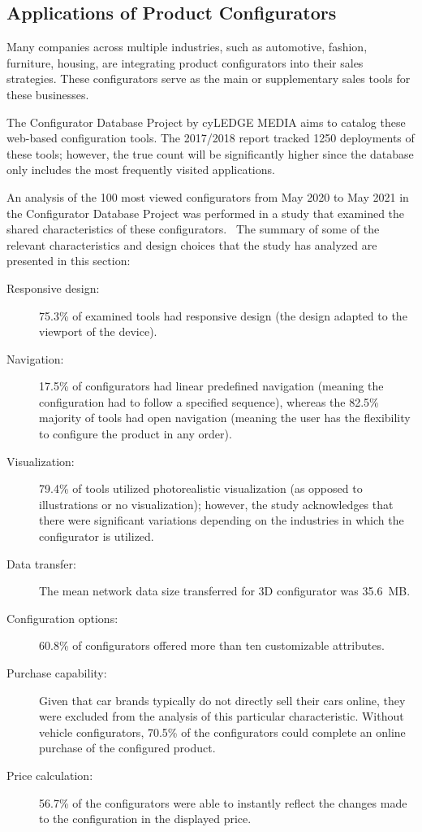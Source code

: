 \subsection{Applications of Product Configurators}

Many companies across multiple industries, such as automotive, fashion, furniture, housing, are integrating product configurators into their sales strategies. These configurators serve as the main or supplementary sales tools for these businesses.

The Configurator Database Project by cyLEDGE MEDIA aims to catalog these web-based configuration tools. The 2017/2018 report tracked 1250 deployments of these tools; however, the true count will be significantly higher since the database only includes the most frequently visited applications.~\cite{cyLEDGE2018}

An analysis of the 100 most viewed configurators from May 2020 to May 2021 in the Configurator Database Project was performed in a study that examined the shared characteristics of these configurators.~\cite{Blazek2023} The summary of some of the relevant characteristics and design choices that the study has analyzed are presented in this section:
\begin{description}
    \item[Responsive design:] 75.3\% of examined tools had responsive design (the design adapted to the viewport of the device).
    \item[Navigation:] 17.5\% of configurators had linear predefined navigation (meaning the configuration had to follow a specified sequence), whereas the 82.5\% majority of tools had open navigation (meaning the user has the flexibility to configure the product in any order).
    \item[Visualization:] 79.4\% of tools utilized photorealistic visualization (as opposed to illustrations or no visualization); however, the study acknowledges that there were significant variations depending on the industries in which the configurator is utilized.
    \item[Data transfer:] The mean network data size transferred for 3D configurator was 35.6~MB.
    \item[Configuration options:] 60.8\% of configurators offered more than ten customizable attributes.
    \item[Purchase capability:] Given that car brands typically do not directly sell their cars online, they were excluded from the analysis of this particular characteristic. Without vehicle configurators, 70.5\% of the configurators could complete an online purchase of the configured product.
    \item[Price calculation:] 56.7\% of the configurators were able to instantly reflect the changes made to the configuration in the displayed price.
\end{description}

